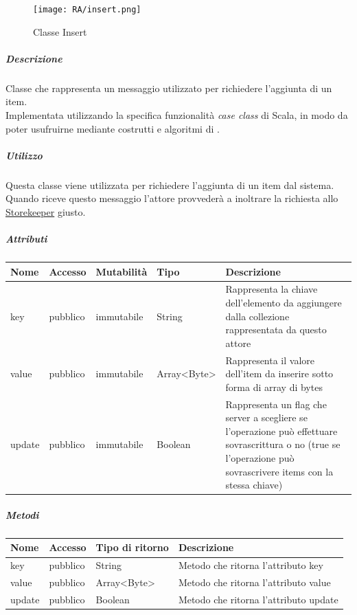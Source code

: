 \documentclass{scalatekids-article}
\begin{document}
\begin{figure}[H]
  \begin{center}
    \texttt{[image: RA/insert.png]}
    \caption{Classe Insert}
  \end{center}
\end{figure}

\subparagraph{Descrizione}

Classe che rappresenta un messaggio utilizzato per richiedere l'aggiunta di un item.\\Implementata utilizzando la specifica funzionalità \textit{case class} di Scala,
in modo da poter usufruirne mediante costrutti e algoritmi di
.

\subparagraph{Utilizzo}

Questa classe viene utilizzata per richiedere l'aggiunta di un item dal
sistema.\\Quando riceve questo messaggio l'attore provvederà a inoltrare la
richiesta allo
\hyperref[sec:actorbase::actorsystem::actors::storekeeper::Storekeeper]{Storekeeper}
giusto.

\subparagraph{Attributi}
\begin{tabular}{| p{2cm} | p{1.5cm} | p{2cm} | p{3cm} | p{8.5cm} |}
  \hline
  Nome & Accesso & Mutabilità & Tipo & Descrizione\\
  \hline
  key & pubblico & immutabile & String & Rappresenta la chiave dell'elemento da aggiungere dalla collezione rappresentata da questo attore\\
  \hline
  value & pubblico & immutabile & Array<Byte> & Rappresenta il valore dell'item da inserire sotto forma di array di bytes\\
  \hline
  update & pubblico & immutabile & Boolean & Rappresenta un flag che server a scegliere se l'operazione può effettuare sovrascrittura o no (true se l'operazione può sovrascrivere items con la stessa chiave)\\
  \hline
\end{tabular}

\subparagraph{Metodi}
\begin{tabular}{| l | l | l | l |}
  \hline
  Nome & Accesso & Tipo di ritorno & Descrizione\\
  \hline
  key & pubblico & String & Metodo che ritorna l'attributo key\\
  \hline
  value & pubblico & Array<Byte> & Metodo che ritorna l'attributo value\\
  \hline
  update & pubblico & Boolean & Metodo che ritorna l'attributo update\\
  \hline
\end{tabular}
\end{document}
